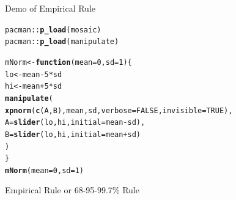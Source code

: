 \documentclass[10pt,handout]{beamer}\usepackage[]{graphicx}\usepackage[]{color}
\makeatletter
\newcommand{\hlnum}[1]{\textcolor[rgb]{0.686,0.059,0.569}{#1}}%
\newcommand{\hlopt}[1]{\textcolor[rgb]{0,0,0}{#1}}%
\newcommand{\hlstd}[1]{\textcolor[rgb]{0.345,0.345,0.345}{#1}}%
\newcommand{\hlkwa}[1]{\textcolor[rgb]{0.161,0.373,0.58}{\textbf{#1}}}%
\newcommand{\hlkwb}[1]{\textcolor[rgb]{0.69,0.353,0.396}{#1}}%
\newcommand{\hlkwc}[1]{\textcolor[rgb]{0.333,0.667,0.333}{#1}}%
\newcommand{\hlkwd}[1]{\textcolor[rgb]{0.737,0.353,0.396}{\textbf{#1}}}%
\newenvironment{kframe}{%
 \def\at@end@of@kframe{}%
 \ifinner\ifhmode%
  \def\at@end@of@kframe{\end{minipage}}%
  \begin{minipage}{\columnwidth}%
 \fi\fi%
 \def\FrameCommand##1{\hskip\@totalleftmargin \hskip-\fboxsep
 \colorbox{shadecolor}{##1}\hskip-\fboxsep
     \hskip-\linewidth \hskip-\@totalleftmargin \hskip\columnwidth}%
 \MakeFramed {\advance\hsize-\width
   \@totalleftmargin\z@ \linewidth\hsize
   \@setminipage}}%
 {\par\unskip\endMakeFramed%
 \at@end@of@kframe}
\newenvironment{knitrout}{}{} %
\makeatother
\begin{document}
\begin{frame}[fragile]{Demo of Empirical Rule}
	
\begin{knitrout}\tiny
{}\color{fgcolor}\begin{kframe}
\begin{alltt}
\hlstd{pacman}\hlopt{::}\hlkwd{p_load}\hlstd{(mosaic)}
\hlstd{pacman}\hlopt{::}\hlkwd{p_load}\hlstd{(manipulate)}

\hlstd{mNorm} \hlkwb{<-} \hlkwa{function}\hlstd{(}\hlkwc{mean} \hlstd{=} \hlnum{0}\hlstd{,} \hlkwc{sd} \hlstd{=} \hlnum{1}\hlstd{) \{}
\hlstd{lo} \hlkwb{<-} \hlstd{mean} \hlopt{-} \hlnum{5} \hlopt{*} \hlstd{sd}
\hlstd{hi} \hlkwb{<-} \hlstd{mean} \hlopt{+} \hlnum{5} \hlopt{*} \hlstd{sd}
\hlkwd{manipulate}\hlstd{(}
\hlkwd{xpnorm}\hlstd{(}\hlkwd{c}\hlstd{(A,B), mean, sd,} \hlkwc{verbose} \hlstd{=} \hlnum{FALSE}\hlstd{,} \hlkwc{invisible} \hlstd{=} \hlnum{TRUE}\hlstd{),}
\hlkwc{A} \hlstd{=} \hlkwd{slider}\hlstd{(lo, hi,} \hlkwc{initial} \hlstd{= mean} \hlopt{-} \hlstd{sd),}
\hlkwc{B} \hlstd{=} \hlkwd{slider}\hlstd{(lo, hi,} \hlkwc{initial} \hlstd{= mean} \hlopt{+} \hlstd{sd)}
\hlstd{)}
\hlstd{\}}
\hlkwd{mNorm}\hlstd{(}\hlkwc{mean} \hlstd{=} \hlnum{0}\hlstd{,} \hlkwc{sd} \hlstd{=} \hlnum{1}\hlstd{)}
\end{alltt}
\end{kframe}
\end{knitrout}
\end{frame}


\begin{frame}[fragile]{Empirical Rule or 68-95-99.7\% Rule}
	
	
\end{frame}
\end{document}
